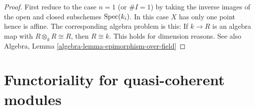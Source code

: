 \begin{proof}
First reduce to the case $n = 1$ (or $\#I = 1$)
by taking the inverse images of the
open and closed subschemes $\mathop{\rm Spec}(k_i)$.
In this case $X$ has only one point hence is affine.
The corresponding algebra problem is this:
If $k \to R$ is an algebra map
with $R \otimes_k R \cong R$, then $R \cong k$.
This holds for dimension reasons.
See also
Algebra, Lemma \ref{algebra-lemma-epimorphism-over-field}
\end{proof}










\section{Functoriality for quasi-coherent modules}
\label{section-quasi-coherent}

